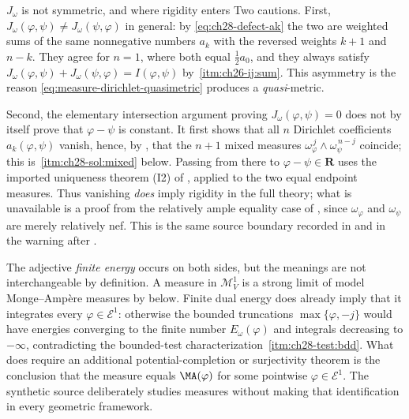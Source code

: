 \begin{warning}{\(J_\omega\) is not symmetric, and where rigidity enters}
Two cautions.  First, \(J_\omega(\varphi,\psi)\neq J_\omega(\psi,\varphi)\)
in general: by \eqref{eq:ch28-defect-ak} the two are weighted sums of the
same nonnegative numbers \(a_k\) with the reversed weights \(k+1\) and
\(n-k\).  They agree for \(n=1\), where both equal \(\tfrac12a_0\), and they
always satisfy
\(J_\omega(\varphi,\psi)+J_\omega(\psi,\varphi)=I(\varphi,\psi)\) by
\,\cref{itm:ch26-ij:sum}.  This
asymmetry is the reason
\eqref{eq:measure-dirichlet-quasimetric} produces a \emph{quasi}-metric.

Second, the elementary intersection argument proving
\(J_\omega(\varphi,\psi)=0\) does not by itself prove that
\(\varphi-\psi\) is constant.  It first shows that all \(n\) Dirichlet
coefficients \(a_k(\varphi,\psi)\) vanish, hence, by
, that the \(n+1\) mixed measures
\(\omega_\varphi^{\,j}\wedge\omega_\psi^{\,n-j}\) coincide; this is
\,\cref{itm:ch28-sol:mixed} below.  Passing from
there to \(\varphi-\psi\in\mathbf R\) uses the imported uniqueness theorem
\textup{(I2)} of , applied to the two equal endpoint
measures.  Thus vanishing \emph{does} imply rigidity in the full theory;
what is unavailable is a proof from the relatively ample equality case of
, since \(\omega_\varphi\) and
\(\omega_\psi\) are merely relatively nef.  This is the same source
boundary recorded in  and in the warning after
.
\end{warning}

\begin{remark}
\label{rem:ch28-two-energies}
The adjective \emph{finite energy} occurs on both sides, but the meanings
are not interchangeable by definition.  A measure in
\(\mathcal M^1_V\) is a strong limit of model Monge--Amp\`ere measures by
 below.  Finite dual energy does
already imply that it integrates every \(\varphi\in\mathcal E^1\): otherwise
the bounded truncations \(\max\{\varphi,-j\}\) would have energies converging
to the finite number \(E_\omega(\varphi)\) and integrals decreasing to
\(-\infty\), contradicting the bounded-test characterization
\,\cref{itm:ch28-test:bdd}.  What does require an
additional potential-completion or surjectivity theorem is the conclusion
that the measure equals \(\MA(\varphi)\) for some pointwise
\(\varphi\in\mathcal E^1\).  The synthetic source
\cite{BJ25FiniteEnergy} deliberately studies measures without making that
identification in every geometric framework.
\end{remark}

